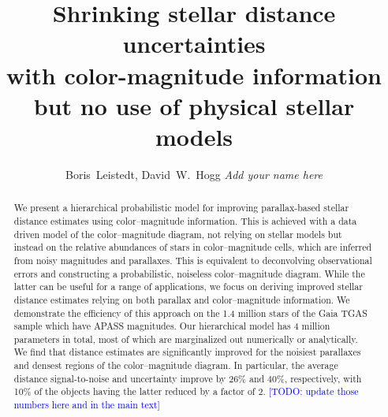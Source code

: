 \documentclass[manuscript, letterpaper]{aastex6}
\newcommand{\todo}[1]{\textcolor{blue}{[TODO: #1]}}
\begin{document}
 
\title{Shrinking stellar distance uncertainties\\
 with color-magnitude information \\
  but no use of physical stellar models}
  


\author{
	Boris~Leistedt,
	David~W.~Hogg
	\textit{Add your name here}
	}


  

\begin{abstract}
We present a hierarchical probabilistic model for improving parallax-based stellar distance estimates using color--magnitude information. 
This is achieved with a data driven model of the color--magnitude diagram, not relying on stellar models but instead on the relative abundances of stars in color--magnitude cells, which are inferred from noisy magnitudes and parallaxes.
This is equivalent to deconvolving observational errors and constructing a probabilistic, noiseless color--magnitude diagram.
While the latter can be useful for a range of applications, we focus on deriving improved stellar distance estimates relying on both parallax and color--magnitude information.
We demonstrate the efficiency of this approach on the 1.4 million stars of the Gaia TGAS sample which have APASS magnitudes.
Our hierarchical model has 4 million parameters in total, most of which are marginalized out numerically or analytically.
We find that distance estimates are significantly improved for the noisiest parallaxes and densest regions of the color--magnitude diagram. 
In particular, the average distance signal-to-noise and uncertainty improve by 26\% and 40\%, respectively, with 10\% of the objects having the latter reduced by a factor of 2. \todo{update those numbers here and in the main text}
\end{abstract}


\newpage
\end{document}
